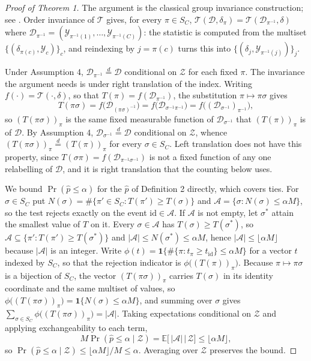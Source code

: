\documentclass[12pt]{article}
\theoremstyle{definition}
\numberwithin{equation}{section}
\begin{document}
\begin{proof}[Proof of Theorem 1]
The argument is the classical group invariance construction; see
\citet[Ch.~15]{lehmann2005testing}. Order invariance of $\mathcal{T}$ gives, for
every $\pi \in S_C$, $\mathcal{T}(\mathcal{D},\delta_\pi) =
\mathcal{T}(\mathcal{D}_{\pi^{-1}},\delta)$ where $\mathcal{D}_{\pi^{-1}} =
(\mathcal{Y}_{\pi^{-1}(1)},\dots,\mathcal{Y}_{\pi^{-1}(C)})$: the statistic is
computed from the multiset $\{(\delta_{\pi(c)},\mathcal{Y}_c)\}_c$, and
reindexing by $j = \pi(c)$ turns this into
$\{(\delta_j,\mathcal{Y}_{\pi^{-1}(j)})\}_j$.

Under Assumption 4, $\mathcal{D}_{\pi^{-1}} \overset{d}{=}
\mathcal{D}$ conditional on $\mathcal{Z}$ for each fixed $\pi$. The invariance
the argument needs is under right translation of the index. Writing
$f(\cdot) = \mathcal{T}(\cdot,\delta)$, so that $T(\pi) =
f(\mathcal{D}_{\pi^{-1}})$, the substitution $\pi \mapsto \pi\sigma$ gives
$$
T(\pi\sigma) = f\big(\mathcal{D}_{(\pi\sigma)^{-1}}\big)
              = f\big(\mathcal{D}_{\sigma^{-1}\pi^{-1}}\big)
              = f\big((\mathcal{D}_{\sigma^{-1}})_{\pi^{-1}}\big),
$$
so $(T(\pi\sigma))_{\pi}$ is the same fixed measurable function of
$\mathcal{D}_{\sigma^{-1}}$ that $(T(\pi))_{\pi}$ is of $\mathcal{D}$. By
Assumption 4, $\mathcal{D}_{\sigma^{-1}} \overset{d}{=}
\mathcal{D}$ conditional on $\mathcal{Z}$, whence
$(T(\pi\sigma))_{\pi} \overset{d}{=} (T(\pi))_{\pi}$ for every
$\sigma \in S_C$. Left translation does not have this property, since
$T(\sigma\pi) = f(\mathcal{D}_{\pi^{-1}\sigma^{-1}})$ is not a fixed function
of any one relabelling of $\mathcal{D}$, and it is right translation that the
counting below uses.

We bound $\Pr(\hat{p} \le \alpha)$ for the $\hat{p}$ of Definition
2 directly, which covers ties. For $\sigma \in S_C$ put
$N(\sigma) = \#\{\pi' \in S_C : T(\pi') \ge T(\sigma)\}$ and $\mathcal{A} =
\{\sigma : N(\sigma) \le \alpha M\}$, so the test rejects exactly on the event
$\mathrm{id} \in \mathcal{A}$. If $\mathcal{A}$ is not empty, let $\sigma^*$
attain the smallest value of $T$ on it. Every $\sigma \in \mathcal{A}$ has
$T(\sigma) \ge T(\sigma^*)$, so $\mathcal{A} \subseteq \{\pi' : T(\pi') \ge
T(\sigma^*)\}$ and $|\mathcal{A}| \le N(\sigma^*) \le \alpha M$, hence
$|\mathcal{A}| \le \lfloor \alpha M \rfloor$ because $|\mathcal{A}|$ is an
integer. Write $\phi(t) = \mathbf{1}\{\#\{\pi : t_\pi \ge t_{\mathrm{id}}\}
\le \alpha M\}$ for a vector $t$ indexed by $S_C$, so that the rejection
indicator is $\phi\big((T(\pi))_\pi\big)$. Because $\pi \mapsto \pi\sigma$ is
a bijection of $S_C$, the vector $(T(\pi\sigma))_\pi$ carries $T(\sigma)$ in
its identity coordinate and the same multiset of values, so
$\phi\big((T(\pi\sigma))_\pi\big) = \mathbf{1}\{N(\sigma) \le
\alpha M\}$, and summing over $\sigma$ gives $\sum_{\sigma \in S_C}
\phi\big((T(\pi\sigma))_\pi\big) = |\mathcal{A}|$. Taking expectations
conditional on $\mathcal{Z}$ and applying exchangeability to each term,
$$
M \Pr(\hat{p} \le \alpha \mid \mathcal{Z})
= \mathbb{E}\big[\,|\mathcal{A}| \,\big|\, \mathcal{Z}\big]
\le \lfloor \alpha M \rfloor ,
$$
so $\Pr(\hat{p} \le \alpha \mid \mathcal{Z}) \le \lfloor \alpha M\rfloor/M
\le \alpha$. Averaging over $\mathcal{Z}$ preserves the bound.


\end{proof}
\end{document}
